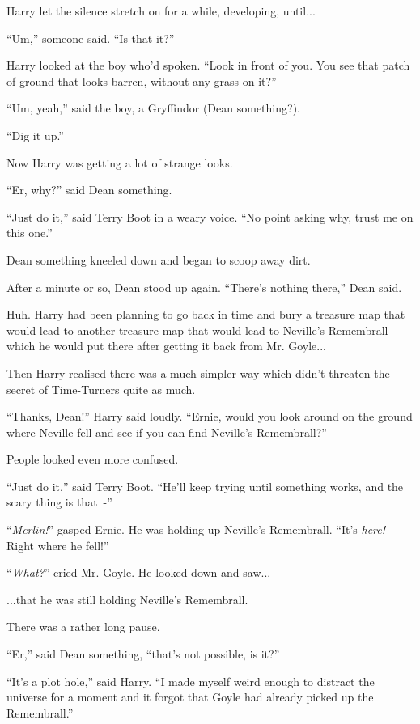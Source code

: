 Harry let the silence stretch on for a while, developing, until...

``Um,'' someone said. ``Is that it?''

Harry looked at the boy who'd spoken. ``Look in front of you. You see that patch of ground that looks barren, without any grass on it?''

``Um, yeah,'' said the boy, a Gryffindor (Dean something?).

``Dig it up.''

Now Harry was getting a lot of strange looks.

``Er, why?'' said Dean something.

``Just do it,'' said Terry Boot in a weary voice. ``No point asking why, trust me on this one.''

Dean something kneeled down and began to scoop away dirt.

After a minute or so, Dean stood up again. ``There's nothing there,'' Dean said.

Huh. Harry had been planning to go back in time and bury a treasure map that would lead to another treasure map that would lead to Neville's Remembrall which he would put there after getting it back from Mr. Goyle...

Then Harry realised there was a much simpler way which didn't threaten the secret of Time-Turners quite as much.

``Thanks, Dean!'' Harry said loudly. ``Ernie, would you look around on the ground where Neville fell and see if you can find Neville's Remembrall?''

People looked even more confused.

``Just do it,'' said Terry Boot. ``He'll keep trying until something works, and the scary thing is that~-''

``\emph{Merlin!}'' gasped Ernie. He was holding up Neville's Remembrall. ``It's \emph{here!} Right where he fell!''

``\emph{What?}'' cried Mr. Goyle. He looked down and saw...

...that he was still holding Neville's Remembrall.

There was a rather long pause.

``Er,'' said Dean something, ``that's not possible, is it?''

``It's a plot hole,'' said Harry. ``I made myself weird enough to distract the universe for a moment and it forgot that Goyle had already picked up the Remembrall.''

